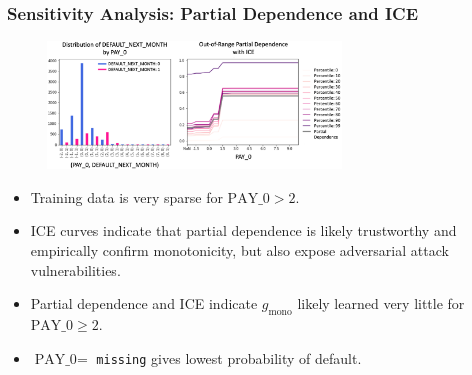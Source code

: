 \documentclass[11pt,
               aspectratio=169,
               hyperref={colorlinks}
               ]{beamer}
\begin{document}
			\begin{frame}[t]
		
				\frametitle{\textbf{Sensitivity Analysis}: Partial Dependence and ICE}
				\vspace{-15pt}
				\begin{figure}
					\begin{center}
						\includegraphics[height=96pt]{img/pd.png}
					\end{center}
				\end{figure}
				\vspace{-10pt}
				\begin{itemize}	
					\item \scriptsize Training data is very sparse for $\text{PAY\_0} > 2$.\\
					\item ICE curves indicate that partial dependence is likely trustworthy and empirically confirm monotonicity, but also expose adversarial attack vulnerabilities.
					\item Partial dependence and ICE indicate $g_{\text{mono}}$ likely learned very little for $\text{PAY\_0} \geq 2$.
					\item $\text{PAY\_0} = $ \texttt{missing} gives lowest probability of default.
				\end{itemize}\normalsize
		
			\end{frame}
\end{document}
